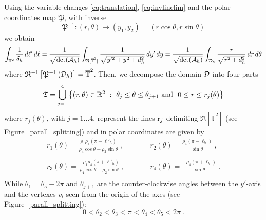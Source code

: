 \documentclass[11pt]{report}
\def\R{\mathbb{R}}
\def\calA{\mathcal{A}}
\def\2toro{\mathbb{T}^2}
\def\trasl2toro{\overline{\mathbb{T}}^2}
\begin{document}
Using the variable changes \eqref{eq:translation}, \eqref{eq:invlinelim} and
the polar coordinates map $\mathfrak{P}$, with inverse
%
\begin{displaymath}
\mathfrak{P}^{-1}: (r,\theta)\mapsto (y_1, y_2) = (r \cos\theta, r
\sin\theta)
\end{displaymath}
%
we obtain
%
\begin{equation}
  \int_{\2toro} {1\over {\delta_h}}\,d\ell'\,d\ell = \frac{1}
  {\sqrt{\det({\calA_h})}} \int_{{\mathfrak{R}}[\trasl2toro]}
  \frac{1}{\sqrt{y'^2+y^2 + d_h^2}}\,d y'\,d y =
  \frac{1}{\sqrt{\det({\calA_h})}} \int_{{\cal D}_h} \frac{r}{\sqrt{r^2 +
      d_h^2}}\,d r\,d \theta
\label{approx_integral}
\end{equation}
%
where $\mathfrak{R}^{-1}\left[\mathfrak{P}^{-1}\left({{\cal
        D}_h}\right)\right] = \trasl2toro$.
%
Then, we decompose the domain ${\cal D}$ into four parts 
%
$$
\mathfrak{T} = \bigcup_{j=1}^4 \left\{(r,\theta)\in \R^2 \ :\
\theta_j\leq \theta \leq \theta_{j+1} \hbox{ and }\ 0\leq r\leq
r_j(\theta) \right\}
$$
%
where $r_j(\theta)$, with $j=1\dots 4$, represent the lines ${\rm
  r}_j$ delimiting $\mathfrak{R}[\trasl2toro ]$ (see
Figure~\ref{parall_splitting}) and in polar coordinates are given
by
\begin{equation*}\begin{matrix}
    r_1(\theta)=\displaystyle\frac{\rho_1 \rho_4 (\pi-\ell'_h)}{\rho_4
      \cos \theta -\rho_2 \sin \theta}\ , & \qquad &
    r_2(\theta)=\displaystyle\frac{\rho_4 (\pi-\ell_h)}{\sin \theta}\ ,\\ & & \\
    r_3(\theta)=\displaystyle\frac{-\rho_1 \rho_4
      (\pi+\ell'_h)}{\rho_4 \cos \theta -\rho_2 \sin \theta}\ , &
    \qquad & r_4(\theta)=\displaystyle\frac{-\rho_4
      (\pi+\ell_h)}{\sin \theta}\ .\\
\end{matrix}	
\end{equation*}
While $\theta_1 = \theta_5 -2\pi$ and $\theta_{j+1}$ are the
counter-clockwise angles between the $y'$-axis and the vertexes $v_l$
seen from the origin of the axes (see Figure~\ref{parall_splitting}):
$$
0 < \theta_2 < \theta_3 < \pi < \theta_4 < \theta_5 < 2\pi\ .
$$
\end{document}
